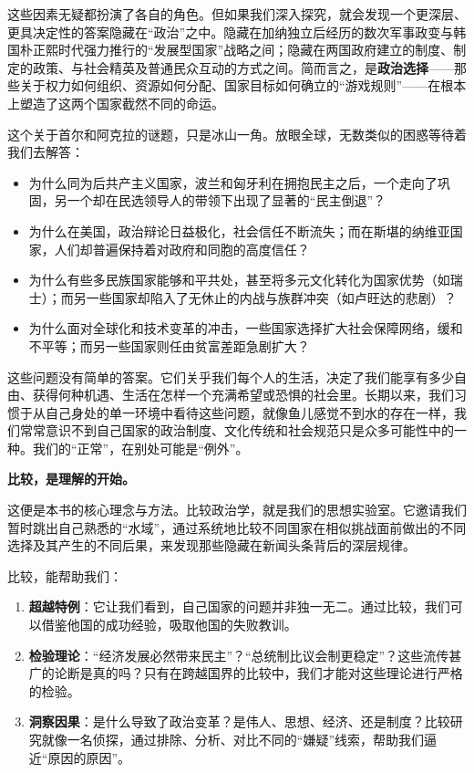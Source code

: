 \documentclass[a5paper, 11pt, openany]{ctexbook}
\begin{document}
这些因素无疑都扮演了各自的角色。但如果我们深入探究，就会发现一个更深层、更具决定性的答案隐藏在“政治”之中。隐藏在加纳独立后经历的数次军事政变与韩国朴正熙时代强力推行的“发展型国家”战略之间；隐藏在两国政府建立的制度、制定的政策、与社会精英及普通民众互动的方式之间。简而言之，是\textbf{政治选择}——那些关于权力如何组织、资源如何分配、国家目标如何确立的“游戏规则”——在根本上塑造了这两个国家截然不同的命运。

这个关于首尔和阿克拉的谜题，只是冰山一角。放眼全球，无数类似的困惑等待着我们去解答：

\begin{itemize}
    \item 为什么同为后共产主义国家，波兰和匈牙利在拥抱民主之后，一个走向了巩固，另一个却在民选领导人的带领下出现了显著的“民主倒退”？
    \item 为什么在美国，政治辩论日益极化，社会信任不断流失；而在斯堪的纳维亚国家，人们却普遍保持着对政府和同胞的高度信任？
    \item 为什么有些多民族国家能够和平共处，甚至将多元文化转化为国家优势（如瑞士）；而另一些国家却陷入了无休止的内战与族群冲突（如卢旺达的悲剧）？
    \item 为什么面对全球化和技术变革的冲击，一些国家选择扩大社会保障网络，缓和不平等；而另一些国家则任由贫富差距急剧扩大？
\end{itemize}

这些问题没有简单的答案。它们关乎我们每个人的生活，决定了我们能享有多少自由、获得何种机遇、生活在怎样一个充满希望或恐惧的社会里。长期以来，我们习惯于从自己身处的单一环境中看待这些问题，就像鱼儿感觉不到水的存在一样，我们常常意识不到自己国家的政治制度、文化传统和社会规范只是众多可能性中的一种。我们的“正常”，在别处可能是“例外”。

\textbf{比较，是理解的开始。}

这便是本书的核心理念与方法。比较政治学，就是我们的思想实验室。它邀请我们暂时跳出自己熟悉的“水域”，通过系统地比较不同国家在相似挑战面前做出的不同选择及其产生的不同后果，来发现那些隐藏在新闻头条背后的深层规律。

比较，能帮助我们：
\begin{enumerate}
    \item \textbf{超越特例}：它让我们看到，自己国家的问题并非独一无二。通过比较，我们可以借鉴他国的成功经验，吸取他国的失败教训。
    \item \textbf{检验理论}：“经济发展必然带来民主”？“总统制比议会制更稳定”？这些流传甚广的论断是真的吗？只有在跨越国界的比较中，我们才能对这些理论进行严格的检验。
    \item \textbf{洞察因果}：是什么导致了政治变革？是伟人、思想、经济、还是制度？比较研究就像一名侦探，通过排除、分析、对比不同的“嫌疑”线索，帮助我们逼近“原因的原因”。
\end{enumerate}
\end{document}
